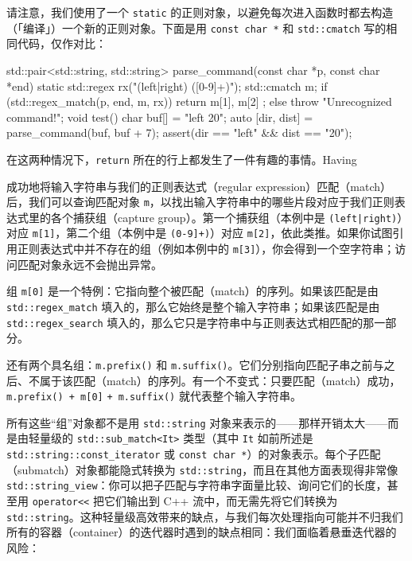 请注意，我们使用了一个 \texttt{static} 的正则对象，以避免每次进入函数时都去构造（「编译」）一个新的正则对象。下面是用 \texttt{const char *} 和 \texttt{std::\allowbreak{}cmatch} 写的相同代码，仅作对比：

\begin{codebox}[cpp]
     std::pair<std::string, std::string>
     parse_command(const char *p, const char *end)
     {
       static std::regex rx("(left|right) ([0-9]+)");
       std::cmatch m;
       if (std::regex_match(p, end, m, rx)) {
         return { m[1], m[2] };
       } else {
         throw "Unrecognized command!";
       }
     }
     void test() {
       char buf[] = "left 20";
       auto [dir, dist] = parse_command(buf, buf + 7);
       assert(dir == "left" && dist == "20");
     }
\end{codebox}

在这两种情况下，\texttt{return} 所在的行上都发生了一件有趣的事情。Having

成功地将输入字符串与我们的正则表达式（regular expression）匹配（match）后，我们可以查询匹配对象 \texttt{m}，以找出输入字符串中的哪些片段对应于我们正则表达式里的各个捕获组（capture group）。第一个捕获组（本例中是 \texttt{(\allowbreak{}left|right)\allowbreak{}}）对应 \texttt{m[1]}，第二个组（本例中是 \texttt{(\allowbreak{}0-9]+)\allowbreak{}}）对应 \texttt{m[2]}，依此类推。如果你试图引用正则表达式中并不存在的组（例如本例中的 \texttt{m[3]}），你会得到一个空字符串；访问匹配对象永远不会抛出异常。

组 \texttt{m[0]} 是一个特例：它指向整个被匹配（match）的序列。如果该匹配是由 \texttt{std::\allowbreak{}regex\_\allowbreak{}match} 填入的，那么它始终是整个输入字符串；如果该匹配是由 \texttt{std::\allowbreak{}regex\_\allowbreak{}search} 填入的，那么它只是字符串中与正则表达式相匹配的那一部分。

还有两个具名组：\texttt{m.\allowbreak{}prefix(\allowbreak{})\allowbreak{}} 和 \texttt{m.\allowbreak{}suffix(\allowbreak{})\allowbreak{}}。它们分别指向匹配子串之前与之后、不属于该匹配（match）的序列。有一个不变式：只要匹配（match）成功，\texttt{m.\allowbreak{}prefix(\allowbreak{})\allowbreak{} + m[0]} \texttt{+ m.\allowbreak{}suffix(\allowbreak{})\allowbreak{}} 就代表整个输入字符串。

所有这些“组”对象都不是用 \texttt{std::\allowbreak{}string} 对象来表示的——那样开销太大——而是由轻量级的 \texttt{std::\allowbreak{}sub\_\allowbreak{}match<\allowbreak{}It>\allowbreak{}} 类型（其中 \texttt{It} 如前所述是 \texttt{std::\allowbreak{}string::\allowbreak{}const\_\allowbreak{}iterator} 或 \texttt{const char *}）的对象表示。每个子匹配（submatch）对象都能隐式转换为 \texttt{std::\allowbreak{}string}，而且在其他方面表现得非常像 \texttt{std::\allowbreak{}string\_\allowbreak{}view}：你可以把子匹配与字符串字面量比较、询问它们的长度，甚至用 \texttt{operator<<} 把它们输出到 C++ 流中，而无需先将它们转换为 \texttt{std::\allowbreak{}string}。这种轻量级高效带来的缺点，与我们每次处理指向可能并不归我们所有的容器（container）的迭代器时遇到的缺点相同：我们面临着悬垂迭代器的风险：

